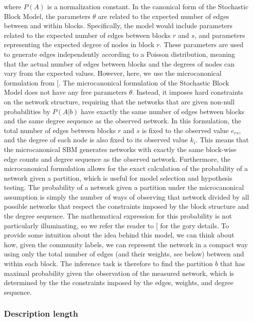 \documentclass[
]{article}
\begin{document}
where \(P(A)\) is a normalization constant. In the canonical form of the
Stochastic Block Model, the parameters \(\theta\) are related to the
expected number of edges between and within blocks. Specifically, the
model would include parameters related to the expected number of edges
between blocks \(r\) and \(s\), and parameters representing the expected
degree of nodes in block \(r\). These parameters are used to generate
edges independently according to a Poisson distribution, meaning that
the actual number of edges between blocks and the degrees of nodes can
vary from the expected values. However, here, we use the microcanonical
formulation from {[}\citeproc{ref-Peixoto2018-or}{14}{]}. The
microcanonical formulation of the Stochastic Block Model does not have
any free parameters \(\theta\). Instead, it imposes hard constraints on
the network structure, requiring that the networks that are given
non-null probabilities by \(P(A| b)\) have exactly the same number of
edges between blocks and the same degree sequence as the observed
network. In this formulation, the total number of edges between blocks
\(r\) and \(s\) is fixed to the observed value \(e_{rs}\), and the
degree of each node is also fixed to its observed value \(k_i\). This
means that the microcanonical SBM generates networks with exactly the
same block-wise edge counts and degree sequence as the observed network.
Furthermore, the microcanonical formulation allows for the exact
calculation of the probability of a network given a partition, which is
useful for model selection and hypothesis testing. The probability of a
network given a partition under the microcanonical assumption is simply
the number of ways of observing that network divided by all possible
networks that respect the constraints imposed by the block structure and
the degree sequence. The mathematical expression for this probability is
not particularly illuminating, so we refer the reader to
{[}\citeproc{ref-Peixoto2017-zw}{15}{]} for the gory details. To provide
some intuition about the idea behind this model, we can think about how,
given the community labels, we can represent the network in a compact
way using only the total number of edges (and their weights, see below)
between and within each block. The inference task is therefore to find
the partition \(b\) that has maximal probability given the observation
of the measured network, which is determined by the the constraints
imposed by the edges, weights, and degree sequence.

\subsubsection{Description length}\label{description-length}
\end{document}
